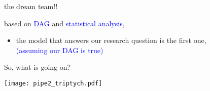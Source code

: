 %
%
\begin{lhframe}[rhgraphic={\texttt{[image: pipe2\_reg1.png]}}]
	{the dream team!!}
	
	based on \textcolor{blue}{DAG} and \textcolor{blue}{statistical analysis},
	\begin{itemize}
		\item the model that answers our research question is the first one, \\
		{\small \textcolor{blue}{(assuming our DAG is true)} }
	\end{itemize}
\end{lhframe}
%
%
\begin{frame}
	{So, what is going on?}
	
	\begin{figure*}
		\texttt{[image: pipe2\_triptych.pdf]}
	\end{figure*}
\end{frame}
%
%
